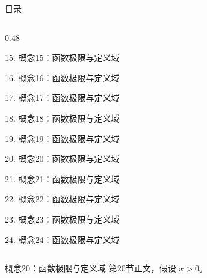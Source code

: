 \documentclass[aspectratio=169,10pt,fontset=fandol]{ctexbeamer}
\begin{document}
\begin{frame}[t,fragile]{目录}
\begin{columns}[T,onlytextwidth]
\begin{column}{0.48\textwidth}
{\color{black}\small 15. 概念15：函数极限与定义域\par}\vspace{0.22em}
{\color{black}\small 16. 概念16：函数极限与定义域\par}\vspace{0.22em}
{\color{black}\small 17. 概念17：函数极限与定义域\par}\vspace{0.22em}
{\color{black}\small 18. 概念18：函数极限与定义域\par}\vspace{0.22em}
{\color{black}\small 19. 概念19：函数极限与定义域\par}\vspace{0.22em}
{\color{blue}\small 20. 概念20：函数极限与定义域\par}\vspace{0.22em}
{\color{gray!40}\small 21. 概念21：函数极限与定义域\par}\vspace{0.22em}
{\color{gray!40}\small 22. 概念22：函数极限与定义域\par}\vspace{0.22em}
{\color{gray!40}\small 23. 概念23：函数极限与定义域\par}\vspace{0.22em}
{\color{gray!40}\small 24. 概念24：函数极限与定义域\par}\vspace{0.22em}
\end{column}
\end{columns}
\end{frame}
\begin{frame}[t,fragile]{概念20：函数极限与定义域}
\normalsize
{\normalsize
第20节正文，假设 $x>0$。
}
\end{frame}
\end{document}
